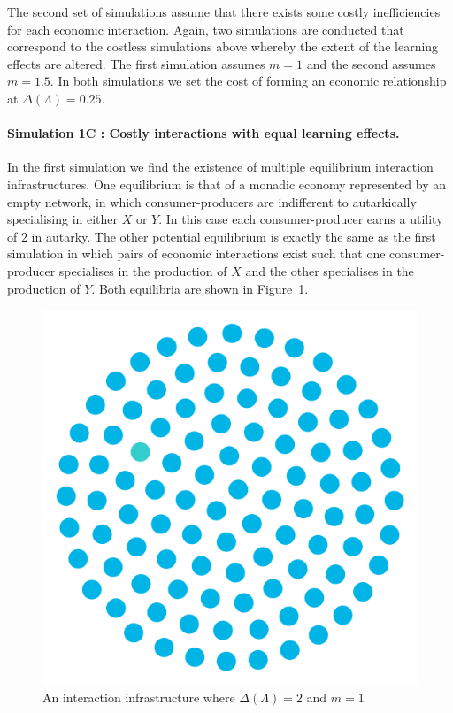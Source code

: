The second set of simulations assume that there exists some costly inefficiencies for each economic interaction. Again, two simulations are conducted that correspond to the costless simulations above whereby the extent of the learning effects are altered. The first simulation assumes $m = 1$ and the second assumes $m = 1.5$. In both simulations we set the cost of forming an economic relationship at $\Delta(\Lambda) = 0.25$.

\paragraph{Simulation 1C : Costly interactions with equal learning effects.}

In the first simulation we find the existence of multiple equilibrium interaction infrastructures. One equilibrium is that of a monadic economy represented by an empty network, in which consumer-producers are indifferent to autarkically specialising in either $X$ or $Y$. In this case each consumer-producer earns a utility of $2$ in autarky. The other potential equilibrium is exactly the same as the first simulation in which pairs of economic interactions exist such that one consumer-producer specialises in the production of $X$ and the other specialises in the production of $Y$. Both equilibria are shown in Figure~\ref{Sim3}.

\begin{figure}[t]
\centering
\includegraphics[scale=0.22]{Images/Sim3E.png}
\caption{An interaction infrastructure where $\Delta(\Lambda)=2$ and $m=1$}
\label{Sim3}
\end{figure}

